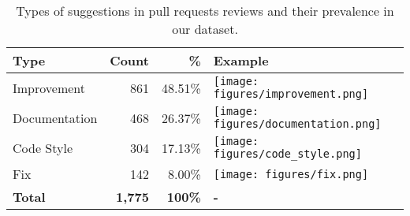 \begin{table*}[ht]
\centering
    \caption{Types of suggestions in pull requests reviews and their prevalence in our dataset.}
    \begin{tabularx}{0.85\textwidth}{l r r l}
    \toprule
     \textbf{Type} &  \textbf{Count} & \textbf{\%} & \textbf{Example}\\
     \midrule
        Improvement & 861 &48.51\% & \parbox[c]{1em}{
      \texttt{[image: figures/improvement.png]}}\\
      \midrule
        Documentation &  468 & 26.37\% & \parbox[c]{1em}{
      \texttt{[image: figures/documentation.png]}}\\
      \midrule
        Code Style & 304 & 17.13\% & \parbox[c]{1em}{
      \texttt{[image: figures/code\_style.png]}} \\
      \midrule
        Fix & 142 & 8.00\% & \parbox[c]{1em}{
      \texttt{[image: figures/fix.png]}}\\
      \midrule
        \textbf{Total} & \textbf{1,775} & \textbf{100\%} & \textbf{-} \\
    \bottomrule
    \end{tabularx}

    \label{tab:suggestion_types}
\end{table*}